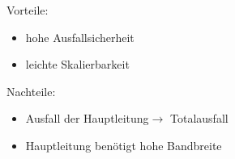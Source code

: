\documentclass[12pt,a4paper]{article}
\begin{document}
\begin{minipage}[t]{.48\textwidth}
\begin{flushleft}
\newline
        \footnotesize Vorteile:
            \begin{itemize}
                \footnotesize
                \item hohe Ausfallsicherheit
                \item leichte Skalierbarkeit
            \end{itemize}
        \footnotesize Nachteile:
            \begin{itemize}
                \footnotesize
                \item Ausfall der Hauptleitung\newline $\longrightarrow$ Totalausfall
                \item Hauptleitung benötigt hohe Bandbreite
            \end{itemize}
		\end{flushleft}
	\end{minipage}
\end{document}
